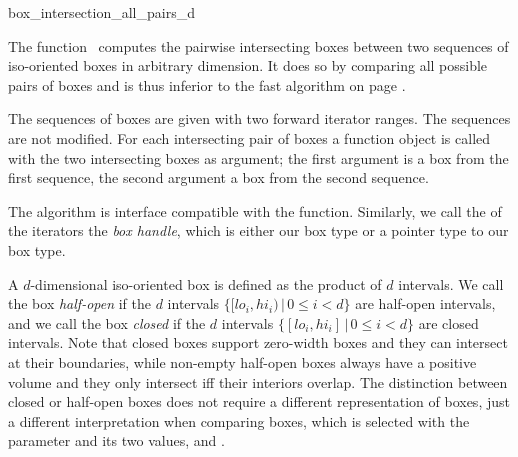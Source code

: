 

\begin{ccRefFunction}{box_intersection_all_pairs_d}

\ccDefinition
  
The function \ccRefName\ computes the pairwise intersecting boxes
between two sequences of iso-oriented boxes in arbitrary dimension.
It does so by comparing all possible pairs of boxes and is thus
inferior to the fast  algorithm on page
\pageref{ccRef_CGAL::box_intersection_d}.

The sequences of boxes are given with two forward iterator ranges. The
sequences are not modified. For each intersecting pair of boxes a
 function object is called with the two intersecting
boxes as argument; the first argument is a box from the first
sequence, the second argument a box from the second sequence.

The algorithm is interface compatible with the
 function. Similarly, we call the
 of the iterators the \emph{box handle}, which is
either our box type or a pointer type to our box type.

A $d$-dimensional iso-oriented box is defined as the
 product of $d$ intervals. We call the
box \emph{half-open} if the $d$ intervals $\{ [lo_i,hi_i) \,|\, 0 \leq
i < d\}$ are half-open intervals, and we call the box \emph{closed} if
the $d$ intervals $\{ [lo_i,hi_i] \,|\, 0 \leq i < d\}$ are closed
intervals. Note that closed boxes support zero-width boxes and they
can intersect at their boundaries, while non-empty half-open boxes
always have a positive volume and they only intersect iff their
interiors overlap.  The distinction between closed or half-open boxes
does not require a different representation of boxes, just a different
interpretation when comparing boxes, which is selected with the
 parameter and its two values,
 and
.


\end{ccRefFunction}
